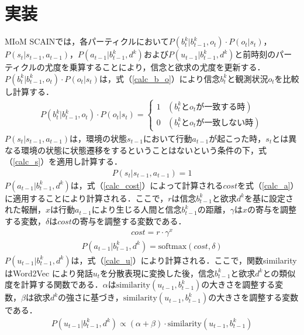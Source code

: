 \section{実装}
\par
MIoM SCAINでは，各パーティクルにおいて$P(b_t^k|b_{t-1}^k,o_t)\cdot P(o_t|s_t)$，$P(s_t|s_{t-1},a_{t-1})$，$P(a_{t-1}|b_{t-1}^k,d^k)$および$P(u_{t-1}|b_{t-1}^k,d^k)$と前時刻のパーティクルの尤度を乗算することにより，信念と欲求の尤度を更新する．$P(b_t^k|b_{t-1}^k,o_t)\cdot P(o_t|s_t)$は，式（\ref{calc_b_o}）により信念$b_t^k$と観測状況$o_t$を比較し計算する．
\begin{equation}
  \begin{split}
  \label{calc_b_o}
  P(b_t^k|b_{t-1}^k,o_t)\cdot P(o_t|s_t)=
  \begin{cases}
    1 & (b_t^kとo_tが一致する時) \\
    0 & (b_t^kとo_tが一致しない時)
  \end{cases}
  \end{split}
\end{equation}
$P(s_t|s_{t-1},a_{t-1})$は，環境の状態$s_{t-1}$において行動$a_{t-1}$が起こった時，$s_t$とは異なる環境の状態に状態遷移をするということはないという条件の下，式（\ref{calc_s}）を適用し計算する．
\begin{equation}
  \begin{split}
  \label{calc_s}
  P(s_t|s_{t-1},a_{t-1})=1
  \end{split}
\end{equation}
$P(a_{t-1}|b_{t-1}^k,d^k)$は，式（\ref{calc_cost}）によって計算される$cost$を式（\ref{calc_a}）に適用することにより計算される．ここで，$r$は信念$b_{t-1}^k$と欲求$d^k$を基に設定された報酬，$x$は行動$a_{t-1}$により生じる人間と信念$b_{t-1}^k$の距離，$\gamma$は$x$の寄与を調整する変数，$\delta$は$cost$の寄与を調整する変数である．
\begin{equation}
  \begin{split}
  \label{calc_cost}
  cost=r\cdot \gamma^{x}
  \end{split}
\end{equation}
\begin{equation}
  \begin{split}
  \label{calc_a}
  P(a_{t-1}|b_{t-1}^k,d^k)=\mathrm{softmax}(cost,\delta)
  \end{split}
\end{equation}
$P(u_{t-1}|b_{t-1}^k,d^k)$は，式（\ref{calc_u}）により計算される．ここで，関数similarityはWord2Vec \cite{mikolov2013efficient}により発話$u_t$を分散表現に変換した後，信念$b_{t-1}^k$と欲求$d^k$との類似度を計算する関数である．$\alpha$は$\mathrm{similarity}(u_{t-1},b_{t-1}^k)$の大きさを調整する変数，$\beta$は欲求$d^k$の強さに基づき，$\mathrm{similarity}(u_{t-1},b_{t-1}^k)$の大きさを調整する変数である．
\begin{equation}
  \begin{split}
  \label{calc_u}
  P(u_{t-1}|b_{t-1}^k,d^k)\propto (\alpha+\beta)\cdot\mathrm{similarity}(u_{t-1},b_{t-1}^k)
  \end{split}
\end{equation}

